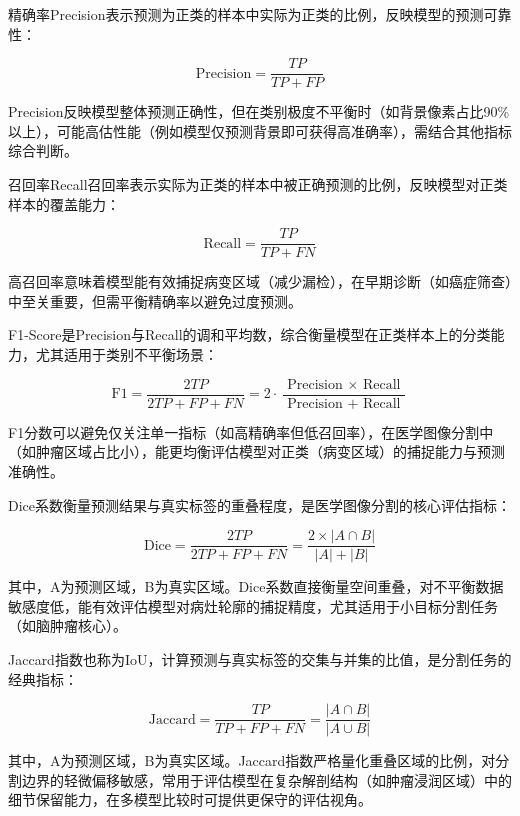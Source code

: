 精确率Precision表示预测为正类的样本中实际为正类的比例，反映模型的预测可靠性：

\begin{equation}
    \mathrm{Precision}=\frac{T P}{T P+F P}
\end{equation}

Precision反映模型整体预测正确性，但在类别极度不平衡时（如背景像素占比90\%以上），可能高估性能（例如模型仅预测背景即可获得高准确率），需结合其他指标综合判断。

召回率Recall召回率表示实际为正类的样本中被正确预测的比例，反映模型对正类样本的覆盖能力：

\begin{equation}
    \mathrm{Recall}=\frac{T P}{T P+F N} 
\end{equation}

高召回率意味着模型能有效捕捉病变区域（减少漏检），在早期诊断（如癌症筛查）中至关重要，但需平衡精确率以避免过度预测。

F1-Score是Precision与Recall的调和平均数，综合衡量模型在正类样本上的分类能力，尤其适用于类别不平衡场景：

\begin{equation}
    \mathrm{F} 1=\frac{2 T P}{2 T P+F P+F N}=2 \cdot \frac{\text { Precision } \times \text { Recall }}{\text { Precision }+ \text { Recall }}
\end{equation}

F1分数可以避免仅关注单一指标（如高精确率但低召回率），在医学图像分割中（如肿瘤区域占比小），能更均衡评估模型对正类（病变区域）的捕捉能力与预测准确性。

Dice系数衡量预测结果与真实标签的重叠程度，是医学图像分割的核心评估指标：

\begin{equation}
    \mathrm{Dice}=\frac{2 T P}{2 T P+F P+F N}=\frac{2 \times|A \cap B|}{|A|+|B|}
\end{equation}

其中，A为预测区域，B为真实区域。Dice系数直接衡量空间重叠，对不平衡数据敏感度低，能有效评估模型对病灶轮廓的捕捉精度，尤其适用于小目标分割任务（如脑肿瘤核心）。

Jaccard指数也称为IoU，计算预测与真实标签的交集与并集的比值，是分割任务的经典指标：

\begin{equation}
    \mathrm{Jaccard}=\frac{T P}{T P+F P+F N}=\frac{|A \cap B|}{|A \cup B|}
\end{equation}

其中，A为预测区域，B为真实区域。Jaccard指数严格量化重叠区域的比例，对分割边界的轻微偏移敏感，常用于评估模型在复杂解剖结构（如肿瘤浸润区域）中的细节保留能力，在多模型比较时可提供更保守的评估视角。
